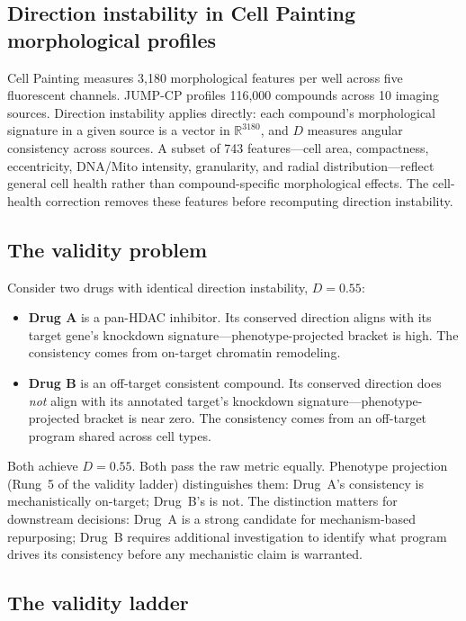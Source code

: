 \documentclass{article}
\begin{document}
\subsection{Direction instability in Cell Painting morphological profiles}

Cell Painting \citep{chandrasekaran2023jump} measures 3{,}180 morphological
features per well across five fluorescent channels. JUMP-CP
profiles 116{,}000 compounds across 10 imaging sources. Direction
instability applies directly: each compound's morphological signature in a
given source is a vector in $\mathbb{R}^{3180}$, and $D$ measures angular
consistency across sources. A subset of 743 features---cell area, compactness,
eccentricity, DNA/Mito intensity, granularity, and radial
distribution---reflect general cell health rather than compound-specific
morphological effects. The cell-health correction removes these features
before recomputing direction instability.

\subsection{The validity problem}

Consider two drugs with identical direction instability, $D = 0.55$:

\begin{itemize}
  \item \textbf{Drug A} is a pan-HDAC inhibitor. Its conserved direction
    aligns with its target gene's knockdown signature---phenotype-projected
    bracket is high. The consistency comes from on-target chromatin
    remodeling.
  \item \textbf{Drug B} is an off-target consistent compound. Its conserved
    direction does \emph{not} align with its annotated target's knockdown
    signature---phenotype-projected bracket is near zero. The consistency
    comes from an off-target program shared across cell types.
\end{itemize}

Both achieve $D = 0.55$. Both pass the raw metric equally. Phenotype
projection (Rung~5 of the validity ladder) distinguishes them: Drug~A's
consistency is mechanistically on-target; Drug~B's is not. The distinction
matters for downstream decisions: Drug~A is a strong candidate for
mechanism-based repurposing; Drug~B requires additional investigation to
identify what program drives its consistency before any mechanistic claim
is warranted.

\subsection{The validity ladder}
\end{document}
